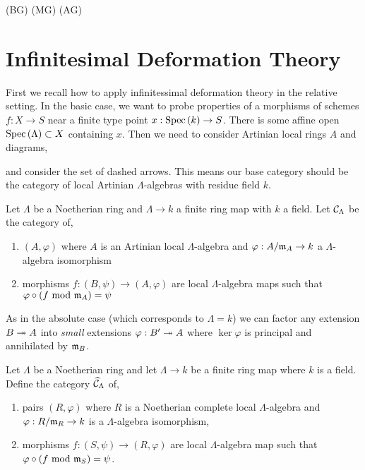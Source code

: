 \documentclass[12pt]{article}
\begin{document}
(BG)
(MG)
(AG)


\section{Infinitesimal Deformation Theory}

\begin{rmk}
First we recall how to apply infinitessimal deformation theory in the relative setting. In the basic case, we want to probe properties of a morphisms of schemes $f : X \to S$ near a finite type point $x : \mathrm{Spec}\left( k \right) \to S$. There is some affine open $\mathrm{Spec}\left( \Lambda \right) \subset X$ containing $x$. Then we need to consider Artinian local rings $A$ and diagrams,
\begin{center}
\end{center}
and consider the set of dashed arrows. This means our base category should be the category of local Artinian $\Lambda$-algebras with residue field $k$.
\end{rmk}

\begin{defn}
Let $\Lambda$ be a Noetherian ring and $\Lambda \to k$ a finite ring map with $k$ a field. Let $\mathcal{C}_\Lambda$ be the category of,
\begin{enumerate}
\item $(A, \varphi)$ where $A$ is an Artinian local $\Lambda$-algebra and $\varphi : A / \mathfrak{m}_A \to k$ a $\Lambda$-algebra isomorphism
\item morphisms $f : (B, \psi) \to (A, \varphi)$ are local $\Lambda$-algebra maps such that $\varphi \circ (f \text{ mod } \mathfrak{m}_A) = \psi$
\end{enumerate}
\end{defn}

\begin{rmk}
As in the absolute case (which corresponds to $\Lambda = k$) we can factor any extension $B \twoheadrightarrow A$ into \textit{small} extensions $\varphi : B' \twoheadrightarrow A$ where $\ker{\varphi}$ is principal and annihilated by $\mathfrak{m}_B$.
\end{rmk}

\begin{defn}
Let $\Lambda$ be a Noetherian ring and let $\Lambda \to k$ be a finite ring map where $k$ is a field. Define the category $\widehat{\mathcal{C}}_\Lambda$ of,
\begin{enumerate}
\item pairs $(R, \varphi)$ where $R$ is a Noetherian complete local $\Lambda$-algebra and $\varphi : R / \mathfrak{m}_R \to k$ is a $\Lambda$-algebra isomorphism,
\item morphisms $f : (S, \psi) \to (R, \varphi)$ are local $\Lambda$-algebra map such that $\varphi \circ (f \text{ mod } \mathfrak{m}_S) = \psi$.
\end{enumerate}
\end{defn}
\end{document}
